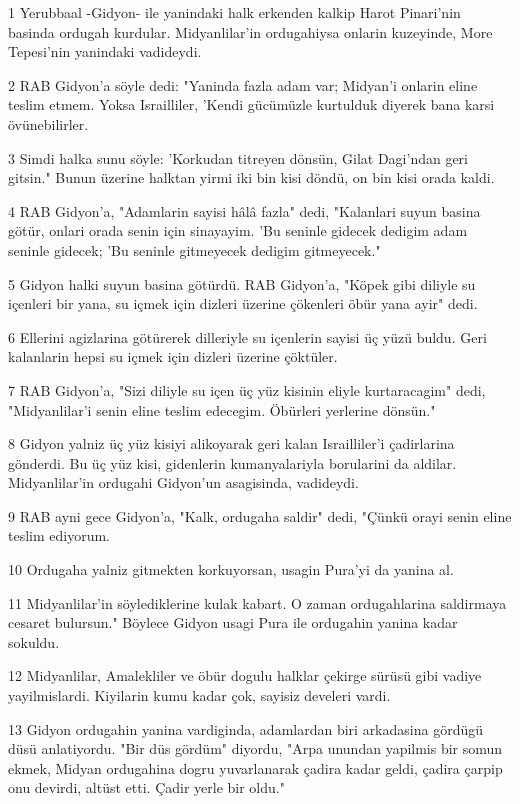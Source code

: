 \par 1 Yerubbaal -Gidyon- ile yanindaki halk erkenden kalkip Harot Pinari'nin basinda ordugah kurdular. Midyanlilar'in ordugahiysa onlarin kuzeyinde, More Tepesi'nin yanindaki vadideydi.
\par 2 RAB Gidyon'a söyle dedi: "Yaninda fazla adam var; Midyan'i onlarin eline teslim etmem. Yoksa Israilliler, 'Kendi gücümüzle kurtulduk diyerek bana karsi övünebilirler.
\par 3 Simdi halka sunu söyle: 'Korkudan titreyen dönsün, Gilat Dagi'ndan geri gitsin." Bunun üzerine halktan yirmi iki bin kisi döndü, on bin kisi orada kaldi.
\par 4 RAB Gidyon'a, "Adamlarin sayisi hâlâ fazla" dedi, "Kalanlari suyun basina götür, onlari orada senin için sinayayim. 'Bu seninle gidecek dedigim adam seninle gidecek; 'Bu seninle gitmeyecek dedigim gitmeyecek."
\par 5 Gidyon halki suyun basina götürdü. RAB Gidyon'a, "Köpek gibi diliyle su içenleri bir yana, su içmek için dizleri üzerine çökenleri öbür yana ayir" dedi.
\par 6 Ellerini agizlarina götürerek dilleriyle su içenlerin sayisi üç yüzü buldu. Geri kalanlarin hepsi su içmek için dizleri üzerine çöktüler.
\par 7 RAB Gidyon'a, "Sizi diliyle su içen üç yüz kisinin eliyle kurtaracagim" dedi, "Midyanlilar'i senin eline teslim edecegim. Öbürleri yerlerine dönsün."
\par 8 Gidyon yalniz üç yüz kisiyi alikoyarak geri kalan Israilliler'i çadirlarina gönderdi. Bu üç yüz kisi, gidenlerin kumanyalariyla borularini da aldilar. Midyanlilar'in ordugahi Gidyon'un asagisinda, vadideydi.
\par 9 RAB ayni gece Gidyon'a, "Kalk, ordugaha saldir" dedi, "Çünkü orayi senin eline teslim ediyorum.
\par 10 Ordugaha yalniz gitmekten korkuyorsan, usagin Pura'yi da yanina al.
\par 11 Midyanlilar'in söylediklerine kulak kabart. O zaman ordugahlarina saldirmaya cesaret bulursun." Böylece Gidyon usagi Pura ile ordugahin yanina kadar sokuldu.
\par 12 Midyanlilar, Amalekliler ve öbür dogulu halklar çekirge sürüsü gibi vadiye yayilmislardi. Kiyilarin kumu kadar çok, sayisiz develeri vardi.
\par 13 Gidyon ordugahin yanina vardiginda, adamlardan biri arkadasina gördügü düsü anlatiyordu. "Bir düs gördüm" diyordu, "Arpa unundan yapilmis bir somun ekmek, Midyan ordugahina dogru yuvarlanarak çadira kadar geldi, çadira çarpip onu devirdi, altüst etti. Çadir yerle bir oldu."
